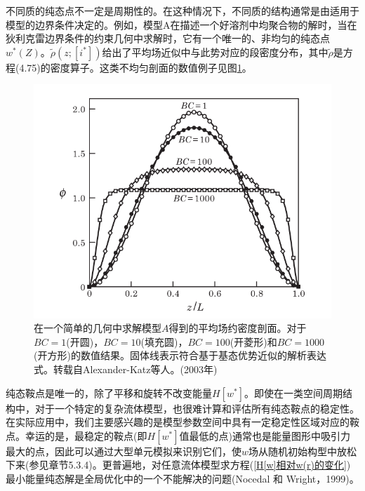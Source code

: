不同质的纯态点不一定是周期性的。在这种情况下，不同质的结构通常是由适用于模型的边界条件决定的。例如，模型A在描述一个好溶剂中均聚合物的解时，当在狄利克雷边界条件的约束几何中求解时，它有一个唯一的、非均匀的纯态点$w^*(Z)$。$\tilde{\rho}(z;[i^*])$给出了平均场近似中与此势对应的段密度分布，其中$\tilde{\rho}$是方程(4.75)的密度算子。这类不均匀剖面的数值例子见图\ref{剖面}。
\begin{figure}[H]
       \centering
        \includegraphics[width=12cm]{./figures/2.png}
       \caption{在一个简单的几何中求解模型$A$得到的平均场约密度剖面。对于$BC=1$(开圆)，$BC=10$(填充圆)，$BC=100$(开菱形)和$BC=1000$(开方形)的数值结果。固体线表示符合基于基态优势近似的解析表达式。转载自Alexander-Katz等人。(2003年)}
        \label{剖面}
 \end{figure}

纯态鞍点是唯一的，除了平移和旋转不改变能量$H[w^*]$。即使在一类空间周期结构中，对于一个特定的复杂流体模型，也很难计算和评估所有纯态鞍点的稳定性。在实际应用中，我们主要感兴趣的是模型参数空间中具有一定稳定性区域对应的鞍点。幸运的是，最稳定的鞍点(即$H[w^*]$值最低的点)通常也是能量图形中吸引力最大的点，因此可以通过大型单元模拟来识别它们，使$w$场从随机初始构型中放松下来(参见章节5.3.4)。更普遍地，对任意流体模型求方程(\ref{H[w]相对w(r)的变化})最小能量纯态解是全局优化中的一个不能解决的问题(Nocedal 和 Wright，1999)。\\

